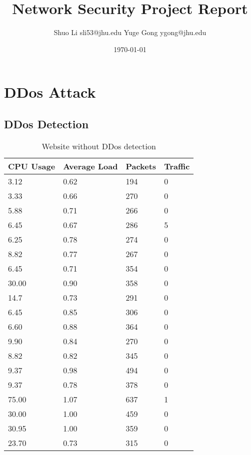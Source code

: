 \documentclass[12pt]{article}
\begin{document}
\title{Network Security Project Report}
\author{Shuo Li sli53@jhu.edu Yuge Gong ygong@jhu.edu}
\date{\today}
\maketitle
\section{DDos Attack}

\subsection{DDos Detection}

\begin{table}[htbp]
\centering
\caption{Website without DDos detection}
\begin{tabular}{ l l l   p{1cm}  }
\hline
  CPU Usage & Average Load & Packets & Traffic
 \\
  \hline
  3.12 & 0.62 & 194 & 0 \\
  3.33 & 0.66 & 270 & 0\\
  5.88 & 0.71 & 266 & 0\\
  6.45 & 0.67 & 286 & 5\\
  6.25 & 0.78 & 274 & 0\\
  8.82 & 0.77 & 267 & 0\\
  6.45 & 0.71 & 354 & 0\\
 30.00 & 0.90 & 358 & 0\\
  14.7 & 0.73 & 291 & 0\\
  6.45 & 0.85 & 306 & 0\\
  6.60 & 0.88 & 364 & 0\\
  9.90 & 0.84 & 270 & 0\\
  8.82 & 0.82 & 345 & 0\\
  9.37 & 0.98 & 494 & 0\\
  9.37 & 0.78 & 378 & 0\\
 75.00 & 1.07 & 637 & 1\\
 30.00 & 1.00 & 459 & 0\\
 30.95 & 1.00 & 359 & 0\\
 23.70 & 0.73 & 315 & 0\\
    \hline
\end{tabular}
\end{table}
\end{document}
